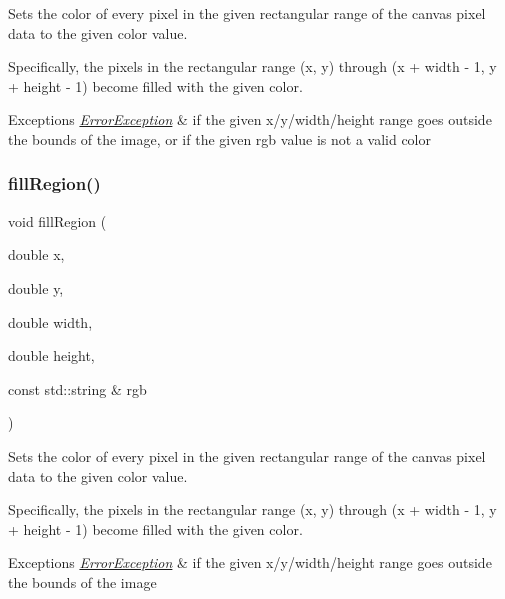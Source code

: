 Sets the color of every pixel in the given rectangular range of the canvas pixel data to the given color value. 

Specifically, the pixels in the rectangular range (x, y) through (x + width -\/ 1, y + height -\/ 1) become filled with the given color. 
\begin{DoxyExceptions}{Exceptions}
{\em \mbox{\hyperlink{classErrorException}{Error\+Exception}}} & if the given x/y/width/height range goes outside the bounds of the image, or if the given rgb value is not a valid color \\
\hline
\end{DoxyExceptions}
\mbox{\label{classGCanvas_a762c611a5065687112018e7a0ab10c84}} 
\subsubsection{\texorpdfstring{fill\+Region()}{fillRegion()}\hspace{0.1cm}{\footnotesize\ttfamily [2/2]}}
{\footnotesize\ttfamily void fill\+Region (\begin{DoxyParamCaption}\item[{double}]{x,  }\item[{double}]{y,  }\item[{double}]{width,  }\item[{double}]{height,  }\item[{const std\+::string \&}]{rgb }\end{DoxyParamCaption})\hspace{0.3cm}{\ttfamily [virtual]}}



Sets the color of every pixel in the given rectangular range of the canvas pixel data to the given color value. 

Specifically, the pixels in the rectangular range (x, y) through (x + width -\/ 1, y + height -\/ 1) become filled with the given color. 
\begin{DoxyExceptions}{Exceptions}
{\em \mbox{\hyperlink{classErrorException}{Error\+Exception}}} & if the given x/y/width/height range goes outside the bounds of the image \\
\hline
\end{DoxyExceptions}
\mbox{\label{classGObservable_a63e5e5a6227c59c928493b11aceb0f67}} 
